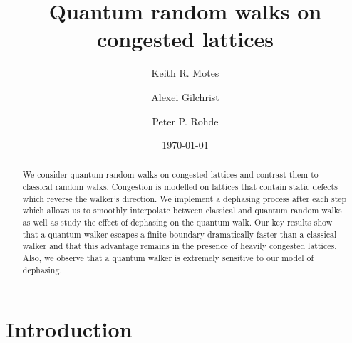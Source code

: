 \documentclass[aps,pra,twocolumn,amsmath,amssymb,nofootinbib,superscriptaddress]{revtex4}
\begin{document}


\title{Quantum random walks on congested lattices}

\author{Keith R. Motes}

\author{Alexei Gilchrist}

\author{Peter P. Rohde}

\date{\today}

\frenchspacing
\begin{abstract}
We consider quantum random walks on congested lattices and contrast them to classical random walks. Congestion is modelled on lattices that contain static defects which reverse the walker's direction. We implement a dephasing process after each step which allows us to smoothly interpolate between classical and quantum random walks as well as study the effect of dephasing on the quantum walk. Our key results show that a quantum walker escapes a finite boundary dramatically faster than a classical walker and that this advantage remains in the presence of heavily congested lattices. Also, we observe that a quantum walker is extremely sensitive to our model of dephasing.

\end{abstract}
\maketitle

\section{Introduction}
\end{document}
